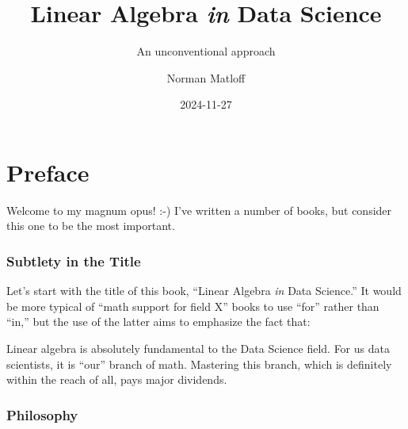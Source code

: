 \documentclass[
  letterpaper,
  DIV=11,
  numbers=noendperiod,
  oneside]{scrreprt}
\title{Linear Algebra \emph{in} Data Science}
\subtitle{An unconventional approach}
\author{Norman Matloff}
\date{2024-11-27}
\renewcommand*\contentsname{Table of contents}
\newcommand\contentsname{Table of contents}
\begin{document}
\maketitle
\ifdefined\Shaded\renewenvironment{Shaded}{\begin{tcolorbox}[frame hidden, interior hidden, sharp corners, enhanced, boxrule=0pt, breakable, borderline west={3pt}{0pt}{shadecolor}]}{\end{tcolorbox}}\fi

\renewcommand*\contentsname{Table of contents}
{
\hypersetup{linkcolor=}
\setcounter{tocdepth}{2}
\tableofcontents
}

\hypertarget{preface}{%
\chapter*{Preface}\label{preface}}


\newpage

Welcome to my magnum opus! :-) I've written a number of books, but
consider this one to be the most important.
{}

\hypertarget{subtlety-in-the-title}{%
\subsection*{Subtlety in the Title}\label{subtlety-in-the-title}}

Let's start with the title of this book, ``Linear Algebra \emph{in} Data
Science.'' It would be more typical of ``math support for field X''
books to use ``for'' rather than ``in,'' but the use of the latter aims
to emphasize the fact that:

Linear algebra is absolutely fundamental to the Data Science field. For
us data scientists, it is ``our'' branch of math. Mastering this branch,
which is definitely within the reach of all, pays major dividends.

\hypertarget{philosophy}{%
\subsection*{Philosophy}\label{philosophy}}
\end{document}
